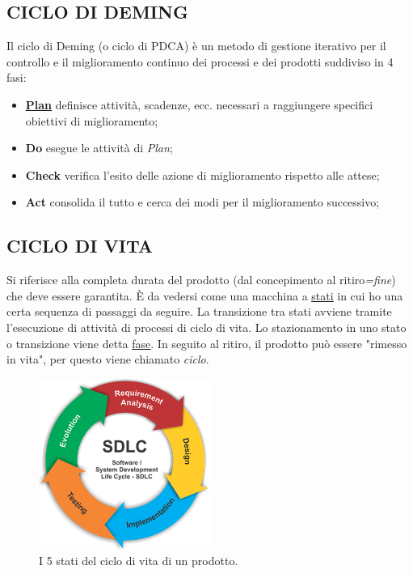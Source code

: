		\subsection{CICLO DI DEMING}  \label{pdca}
		Il ciclo di Deming (o ciclo di PDCA) è un metodo di gestione iterativo per il controllo e il miglioramento continuo dei processi e dei prodotti suddiviso in 4 fasi:
			\begin{itemize}
				\item \textbf{\underline{\hyperref[pianificazione]{Plan}}} definisce attività, scadenze, ecc. necessari a raggiungere specifici obiettivi di miglioramento;
				\item \textbf{Do} esegue le attività di \textit{Plan};
				\item \textbf{Check} verifica l'esito delle azione di miglioramento rispetto alle attese;
				\item \textbf{Act} consolida il tutto e cerca dei modi per il miglioramento successivo; 
			\end{itemize}
		
		\subsection{CICLO DI VITA}  \label{ciclo}
		Si riferisce alla completa durata del prodotto (dal concepimento al ritiro\textit{=fine}) che deve essere garantita. È da vedersi come una macchina a \underline{\hyperref[stato]{stati}} in cui ho una certa sequenza di passaggi da seguire. La transizione tra stati avviene tramite l’esecuzione di
		attività di processi di ciclo di vita. Lo stazionamento in uno stato o transizione viene detta \underline{\hyperref[fase]{fase}}. In seguito al ritiro, il prodotto può essere "rimesso in vita", per questo viene chiamato \textit{ciclo}.
		
		\begin{figure}[H]
			\centering
			\includegraphics[width=0.5\textwidth]{img/lifecycle}		
			\caption{I 5 stati del ciclo di vita di un prodotto.}
		\end{figure} 
		
